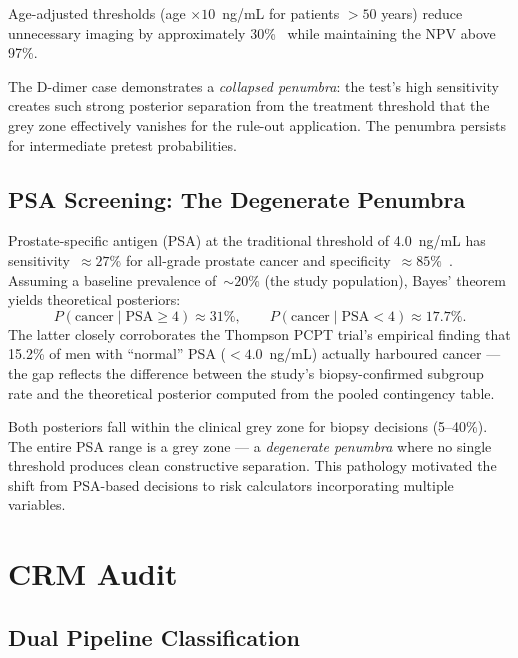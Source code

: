 \documentclass[11pt,a4paper]{article}
\theoremstyle{plain}
\theoremstyle{definition}
\begin{document}
Age-adjusted thresholds (age $\times 10$~ng/mL for patients $> 50$ years) reduce unnecessary imaging by approximately 30\%~\cite{righini2014} while maintaining the NPV above 97\%.

The D-dimer case demonstrates a \emph{collapsed penumbra}: the test's high sensitivity creates such strong posterior separation from the treatment threshold that the grey zone effectively vanishes for the rule-out application.  The penumbra persists for intermediate pretest probabilities.

\subsection{PSA Screening: The Degenerate Penumbra}

Prostate-specific antigen (PSA) at the traditional threshold of 4.0~ng/mL has sensitivity~$\approx 27\%$ for all-grade prostate cancer and specificity~$\approx 85\%$~\cite{thompson2004}.  Assuming a baseline prevalence of~$\sim 20\%$ (the study population), Bayes' theorem yields theoretical posteriors:
\[
  P(\text{cancer} \mid \text{PSA} \geq 4) \approx 31\%, \qquad P(\text{cancer} \mid \text{PSA} < 4) \approx 17.7\%.
\]
The latter closely corroborates the Thompson PCPT trial's empirical finding that 15.2\% of men with ``normal'' PSA ($< 4.0$~ng/mL) actually harboured cancer --- the gap reflects the difference between the study's biopsy-confirmed subgroup rate and the theoretical posterior computed from the pooled contingency table.

Both posteriors fall within the clinical grey zone for biopsy decisions (5--40\%).  The entire PSA range is a grey zone --- a \emph{degenerate penumbra} where no single threshold produces clean constructive separation.  This pathology motivated the shift from PSA-based decisions to risk calculators incorporating multiple variables.

\section{CRM Audit}\label{sec:crm}

\subsection{Dual Pipeline Classification}
\end{document}
